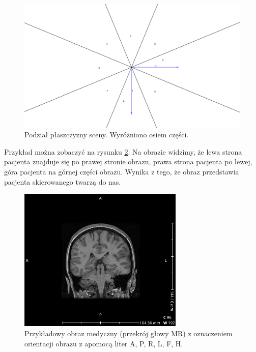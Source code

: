 \begin{figure}[!htbp]
    \centering
    \includegraphics[width=\textwidth]{img/imageorientationindicator-004.png}
    \caption{Podział płaszczyzny sceny. Wyróżniono osiem części.}
    \label{fig:imageorientationindicator4}
\end{figure}

Przykład można zobaczyć na rysunku \ref{fig:imageorientationindicator1}.
Na obrazie widzimy, że lewa strona pacjenta znajduje się po prawej stronie obrazu, prawa strona pacjenta po lewej, góra pacjenta na górnej części obrazu.
Wynika z tego, że obraz przedstawia pacjenta skierowanego twarzą do nas.

\begin{figure}[!htbp]
    \centering
    \includegraphics[width=0.7\textwidth]{img/imageorientationindicator-002.png}
    \caption{Przykładowy obraz medyczny (przekrój głowy MR) z oznaczeniem orientacji obrazu z apomocą liter A, P, R, L, F, H.}
    \label{fig:imageorientationindicator1}
\end{figure}

